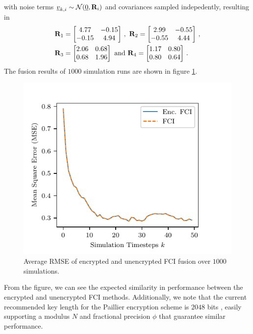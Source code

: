 \documentclass[letterpaper, 10 pt, conference]{ieeeconf}
\begin{document}
with noise terms ${\underline{v}}_{k,i} \sim \mathcal{N}({\underline{0}}, {{\mathbf{R}}}_i)$ and covariances sampled indepedently, resulting in
\begin{equation}
    \begin{split}
        &\mat{R}_1 = 
        \begin{bmatrix}
            4.77 & -0.15\\
            -0.15 & 4.94
        \end{bmatrix}\,,\ 
        \mat{R}_2 = 
        \begin{bmatrix}
            2.99 & -0.55\\
            -0.55 & 4.44
        \end{bmatrix}\,,\\
        &\mat{R}_3 = 
        \begin{bmatrix}
            2.06 & 0.68\\
            0.68 & 1.96
        \end{bmatrix}\text{ and }
        \mat{R}_4 = 
        \begin{bmatrix}
            1.17 & 0.80\\
            0.80 & 0.64
        \end{bmatrix}\,.
    \end{split}
\end{equation}
The fusion results of $1000$ simulation runs are shown in figure \ref{fig:sim_error_plot}. 
\begin{figure}[htbp]
    \centering
    \includegraphics{figures/sim_error_plot.pdf}
    \caption{Average RMSE of encrypted and unencrypted FCI fusion over $1000$ simulations.}
    \label{fig:sim_error_plot}
\end{figure}
From the figure, we can see the expected similarity in performance between the encrypted and unencrypted FCI methods. Additionally, we note that the current recommended key length for the Paillier encryption scheme is $2048$ bits \cite{barkerRecommendationPairWiseKey2019}, easily supporting a modulus $N$ and fractional precision $\phi$ that guarantee similar performance.
\end{document}
